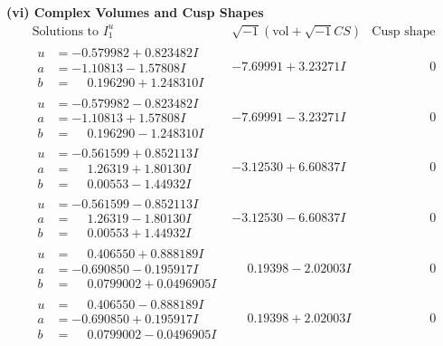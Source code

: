 \documentclass[1p]{elsarticle_modified}
\theoremstyle{definition}
\newcommand{\I}{\sqrt{-1}}
\begin{document}
\newpage\flushleft \textbf{(vi) Complex Volumes and Cusp Shapes}
$$\begin{array}{c|c|c}  
\text{Solutions to }I^u_{1}& \I (\text{vol} + \sqrt{-1}CS) & \text{Cusp shape}\\
 \hline 
\begin{aligned}
u &= -0.579982 + 0.823482 I \\
a &= -1.10813 - 1.57808 I \\
b &= \phantom{-}0.196290 + 1.248310 I\end{aligned}
 & -7.69991 + 3.23271 I & \phantom{-0.000000 } 0 \\ \hline\begin{aligned}
u &= -0.579982 - 0.823482 I \\
a &= -1.10813 + 1.57808 I \\
b &= \phantom{-}0.196290 - 1.248310 I\end{aligned}
 & -7.69991 - 3.23271 I & \phantom{-0.000000 } 0 \\ \hline\begin{aligned}
u &= -0.561599 + 0.852113 I \\
a &= \phantom{-}1.26319 + 1.80130 I \\
b &= \phantom{-}0.00553 - 1.44932 I\end{aligned}
 & -3.12530 + 6.60837 I & \phantom{-0.000000 } 0 \\ \hline\begin{aligned}
u &= -0.561599 - 0.852113 I \\
a &= \phantom{-}1.26319 - 1.80130 I \\
b &= \phantom{-}0.00553 + 1.44932 I\end{aligned}
 & -3.12530 - 6.60837 I & \phantom{-0.000000 } 0 \\ \hline\begin{aligned}
u &= \phantom{-}0.406550 + 0.888189 I \\
a &= -0.690850 - 0.195917 I \\
b &= \phantom{-}0.0799002 + 0.0496905 I\end{aligned}
 & \phantom{-}0.19398 - 2.02003 I & \phantom{-0.000000 } 0 \\ \hline\begin{aligned}
u &= \phantom{-}0.406550 - 0.888189 I \\
a &= -0.690850 + 0.195917 I \\
b &= \phantom{-}0.0799002 - 0.0496905 I\end{aligned}
 & \phantom{-}0.19398 + 2.02003 I & \phantom{-0.000000 } 0 \\ \hline\begin{aligned}

\end{aligned}
\end{array}$$
\end{document}
